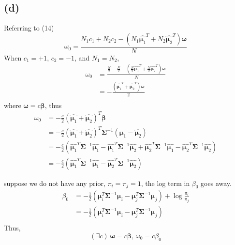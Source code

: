 \documentclass[11pt]{article}
\begin{document}
\subsection*{(d)}
Referring to (14)
$$\omega_0 = \frac{N_1c_1+N_2c_2-\left(N_1\hat{\pmb{\mu}_1}^T+N_2\hat{\pmb{\mu}_2}^T\right)\pmb{\omega}}{N}$$
When $c_1=+1$, $c_2=-1$, and $N_1=N_2$,
\begin{equation}
\begin{split}
\omega_0&=\frac{\frac{N}{2}-\frac{N}{2}-\left(\frac{N}{2}\hat{\pmb{\mu}_1}^T+\frac{N}{2}\hat{\pmb{\mu}_2}^T\right)\pmb{\omega}}{N}\\
&=-\frac{\left(\hat{\pmb{\mu}_1}^T+\hat{\pmb{\mu}_2}^T\right)\pmb{\omega}}{2}\\
\end{split}
\end{equation}
where $\pmb{\omega} = c\pmb{\beta}$, thus
\begin{equation}
\begin{split}
\omega_0&=-\frac{c}{2}\left(\hat{\pmb{\mu}_1}+\hat{\pmb{\mu}_2}\right)^T\pmb{\beta}\\
&=-\frac{c}{2}\left(\hat{\pmb{\mu}_1}+\hat{\pmb{\mu}_2}\right)^T\pmb{\Sigma}^{-1}\left(\hat{\pmb{\mu}_1}-\hat{\pmb{\mu}_2}\right)\\
&=-\frac{c}{2}\left(\hat{\pmb{\mu}_1}^T\pmb{\Sigma}^{-1}\hat{\pmb{\mu}_1}-\hat{\pmb{\mu}_1}^T\pmb{\Sigma}^{-1}\hat{\pmb{\mu}_2}+\hat{\pmb{\mu}_2}^T\pmb{\Sigma}^{-1}\hat{\pmb{\mu}_1}-\hat{\pmb{\mu}_2}^T\pmb{\Sigma}^{-1}\hat{\pmb{\mu}_2}\right)\\
&=-\frac{c}{2}\left(\hat{\pmb{\mu}_1}^T\pmb{\Sigma}^{-1}\hat{\pmb{\mu}_1}-\hat{\pmb{\mu}_2}^T\pmb{\Sigma}^{-1}\hat{\pmb{\mu}_2}\right)
\end{split}
\end{equation}

suppose we do not have any prior, $\pi_i = \pi_j = 1$, the log term in $\beta_0$ goes away.
\begin{equation}
\begin{split}
\beta_0&=-\frac{1}{2}\left(\pmb{\mu}_i^T\pmb{\Sigma}^{-1}\pmb{\mu}_i-\pmb{\mu}_j^T\pmb{\Sigma}^{-1}\pmb{\mu}_j\right)+\log\frac{\pi_i}{\pi_j}\\
&=-\frac{1}{2}\left(\pmb{\mu}_i^T\pmb{\Sigma}^{-1}\pmb{\mu}_i-\pmb{\mu}_j^T\pmb{\Sigma}^{-1}\pmb{\mu}_j\right)\\
\end{split}
\end{equation}
Thus,
$$(\exists c)\ \pmb{\omega}=c\pmb{\beta},\ \omega_0=c\beta_0$$
\end{document}
